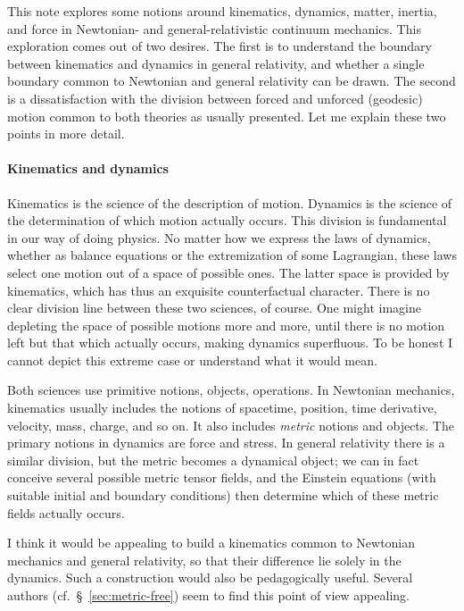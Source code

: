 \documentclass[\ifafour a4paper,12pt,\else a5paper,10pt,\fi%
onecolumn,oneside,article,%
british%
]{memoir}
\theoremstyle{remark}
\theoremstyle{innote}
\renewcommand*{\|}[1][]{\nonscript\,#1\vert\nonscript\;\mathopen{}}
\newcommand*{\sect}{\S}%
\newcommand*{\cf}{{cf.}}
\begin{document}
This note explores some notions around kinematics, dynamics, matter,
inertia, and force in Newtonian- and general-relativistic continuum
mechanics. This exploration comes out of two desires. The first is to
understand the boundary between kinematics and dynamics in general
relativity, and whether a single boundary common to Newtonian and general
relativity can be drawn. The second is a dissatisfaction with the division
between forced and unforced (geodesic) motion common to both theories as
usually presented. Let me explain these two points in more detail.

\paragraph{Kinematics and dynamics}

Kinematics is the science of the description of motion. Dynamics is the
science of the determination of which motion actually occurs. This division
is fundamental in our way of doing physics. No matter how we express the
laws of dynamics, whether as balance equations or the extremization of some
Lagrangian, these laws select one motion out of a space of possible ones.
The latter space is provided by kinematics, which has thus an exquisite
counterfactual character. There is no clear division line between these two
sciences, of course. One might imagine depleting the space of possible
motions more and more, until there is no motion left but that which
actually occurs, making dynamics superfluous. To be honest I cannot depict
this extreme case or understand what it would mean.

Both sciences use primitive notions, objects, operations. In Newtonian
mechanics, kinematics usually includes the notions of spacetime, position,
time derivative, velocity, mass, charge, and so on. It also includes
\emph{metric} notions and objects. The primary notions in dynamics are
force and stress. In general relativity there is a similar division, but
the metric becomes a dynamical object; we can in fact conceive several
possible metric tensor fields, and the Einstein equations (with suitable
initial and boundary conditions) then determine which of these metric
fields actually occurs.

I think it would be appealing to build a kinematics common to Newtonian
mechanics and general relativity, so that their difference lie solely in
the dynamics. Such a construction would also be pedagogically useful.
Several authors (\cf\ \sect~\ref{sec:metric-free}) seem to find this point
of view appealing.
\end{document}
